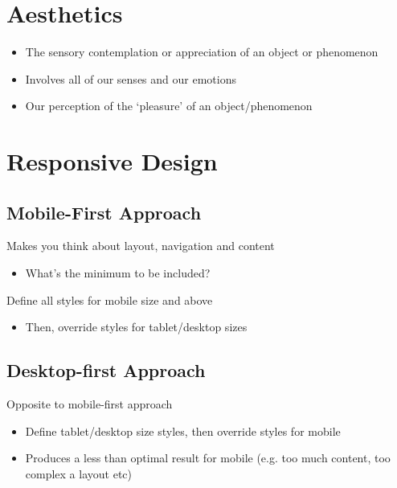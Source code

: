 \section{Aesthetics}
\begin{itemize}
	\item The sensory contemplation or appreciation of an object or phenomenon
	\item Involves all of our senses and our emotions
	\item Our perception of the `pleasure' of an object/phenomenon	
\end{itemize}


\section{Responsive Design}
\subsection{Mobile-First Approach}
Makes you think about layout, navigation and content
\begin{itemize}
	\item What's the minimum to be included?	
\end{itemize}
Define all styles for mobile size and above
\begin{itemize}
	\item Then, override styles for tablet/desktop sizes	
\end{itemize}

\subsection{Desktop-first Approach}
Opposite to mobile-first approach
\begin{itemize}
	\item Define tablet/desktop size styles, then override styles for mobile
	\item Produces a less than optimal result for mobile (e.g. too much content, too complex a layout etc)	
\end{itemize}
